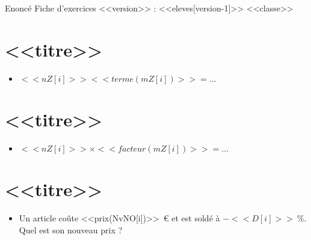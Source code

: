 
{Enoncé} \hfill {\huge Fiche d'exercices \no <<version>> : <<eleves[version-1]>>} \hfill {<<classe>>}

\section{<<titre>>}
\begin{itemize}

  \item $<<nZ[i]>> <<terme(mZ[i])>>=\ldots$
\end{itemize}



\section{<<titre>>}
\begin{itemize}

  \item $<<nZ[i]>>\times<<facteur(mZ[i])>>=\ldots$
\end{itemize}


\section{<<titre>>}
\begin{itemize}

  \item Un article coûte <<prix(NvNO[i])>>~€ et est soldé à $-<<D[i]>>~\%$. Quel est son nouveau prix ?
\end{itemize}
